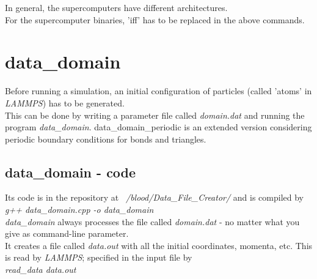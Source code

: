 In general, the supercomputers have different architectures.\\For the supercomputer binaries, 'iff' has to be replaced in the above commands.

\section{data\_domain}
\label{sec:data_domain}
Before running a simulation, an initial configuration of particles (called 'atoms' in \textit{LAMMPS}) has to be generated.\\This can be done by writing a parameter file called \textit{domain.dat} and running the program \textit{data\_domain}. data\_domain\_periodic is an extended version considering periodic boundary conditions for bonds and triangles.
\subsection{data\_domain - code}
Its code is in the repository at \textit{~/blood/Data\_File\_Creator/} and is compiled by\\ \textit{g++ data\_domain.cpp -o data\_domain}\\\textit{data\_domain} always processes the file called \textit{domain.dat} - no matter what you give as command-line parameter.\\It creates a file called \textit{data.out} with all the initial coordinates, momenta, etc. This is read by \textit{LAMMPS}; specified in the input file by\\ \textit{read\_data data.out}

